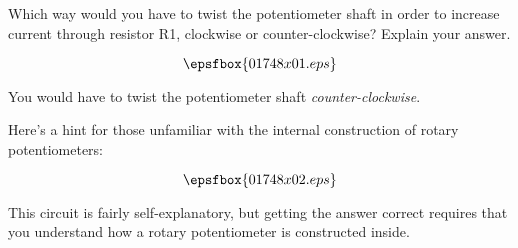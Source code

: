 

Which way would you have to twist the potentiometer shaft in order to increase current through resistor R1, clockwise or counter-clockwise?  Explain your answer.

$$\epsfbox{01748x01.eps}$$







You would have to twist the potentiometer shaft {\it counter-clockwise}.

\vskip 10pt

Here's a hint for those unfamiliar with the internal construction of rotary potentiometers:

$$\epsfbox{01748x02.eps}$$







This circuit is fairly self-explanatory, but getting the answer correct requires that you understand how a rotary potentiometer is constructed inside.





